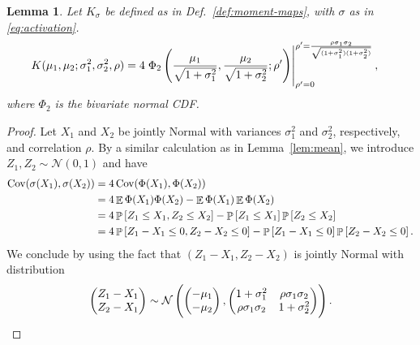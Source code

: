 \documentclass[oneside, article]{memoir}
\newtheorem{lemma}{Lemma}
\DeclareMathOperator{\expect}{\mathbb{E}}
\DeclareMathOperator{\probability}{\mathbb{P}}
\DeclareMathOperator{\Cov}{\operatorname{Cov}}
\begin{document}
\begin{lemma}
  Let \(K_\sigma\) be defined as in Def.~\ref{def:moment-maps}, with
  \(\sigma\) as in \eqref{eq:activation}.
  \begin{align*}
    K(\mu_1, \mu_2; \sigma_1^2, \sigma_2^2, \rho) &=
    4 \left.
    \Phi_2\del{
      \frac{\mu_1}{\sqrt{1 + \sigma_1^2}},
      \frac{\mu_2}{\sqrt{1 + \sigma_2^2}};
      \rho'
    }
    \right|^{\rho' = \frac{\rho \sigma_1 \sigma_2}{\sqrt{(1 +
    \sigma_1^2)(1 + \sigma_2^2)}}}_{\rho' = 0},
  \end{align*}
  where \(\Phi_2\) is the bivariate normal CDF.
\end{lemma}
\begin{proof}
  Let \(X_1\) and \(X_2\) be jointly Normal with variances
  \(\sigma_1^2\) and \(\sigma_2^2\), respectively, and correlation \(\rho\).
  By a similar calculation as in Lemma~\ref{lem:mean}, we introduce
  \(Z_1, Z_2 \sim \mathcal N(0, 1)\) and have
  \begin{align}
    \Cov (\sigma(X_1), \sigma(X_2))
    &= 4 \Cov (\Phi(X_1), \Phi(X_2))
    \\
    &= 4\expect \Phi(X_1) \Phi (X_2) - \expect \Phi(X_1) \expect \Phi(X_2)
    \\
    &= 4 \probability\sbr{Z_1 \leq X_1, Z_2 \leq X_2} -
    \probability\sbr{Z_1 \leq X_1} \probability\sbr{Z_2 \leq X_2}
    \\
    &= 4 \probability\sbr{Z_1 - X_1 \leq 0, Z_2 - X_2 \leq 0} -
    \probability\sbr{Z_1- X_1\leq 0} \probability\sbr{Z_2 - X_2 \leq 0}.
  \end{align}
  We conclude by using the fact that \((Z_1 - X_1, Z_2 - X_2)\) is
  jointly Normal with distribution
  \begin{align}
    \begin{pmatrix}
      Z_1 - X_1
      \\
      Z_2 - X_1
    \end{pmatrix}
    \sim
    \mathcal{N}\del{
      \begin{pmatrix}
        -\mu_1
        \\
        -\mu_2
      \end{pmatrix},
      \begin{pmatrix}
        1 + \sigma_1^2
        &
        \rho \sigma_1 \sigma_2
        \\
        \rho \sigma_1 \sigma_2
        &
        1 + \sigma_2^2
      \end{pmatrix}
    }.
  \end{align}
\end{proof}
\end{document}
